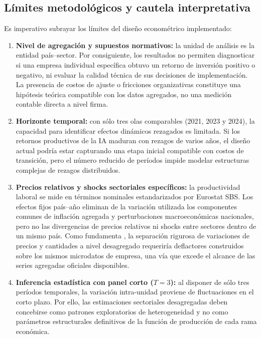 \documentclass[12pt,a4paper]{article}
\begin{document}
\subsection{Límites metodológicos y cautela interpretativa}

Es imperativo subrayar los límites del diseño econométrico implementado:

\begin{enumerate}

    \item \textbf{Nivel de agregación y supuestos normativos:} la unidad de análisis es la entidad país--sector. Por consiguiente, los resultados no permiten diagnosticar si una empresa individual específica obtuvo un retorno de inversión positivo o negativo, ni evaluar la calidad técnica de sus decisiones de implementación. La presencia de costos de ajuste o fricciones organizativas constituye una hipótesis teórica compatible con los datos agregados, no una medición contable directa a nivel firma.

    \item \textbf{Horizonte temporal:} con sólo tres olas comparables (2021, 2023 y 2024), la capacidad para identificar efectos dinámicos rezagados es limitada. Si los retornos productivos de la IA maduran con rezagos de varios años, el diseño actual podría estar capturando una etapa inicial compatible con costos de transición, pero el número reducido de períodos impide modelar estructuras complejas de rezagos distribuidos.

    \item \textbf{Precios relativos y shocks sectoriales específicos:} la productividad laboral se mide en términos nominales estandarizados por Eurostat SBS. Los efectos fijos país--año eliminan de la variación utilizada los componentes comunes de inflación agregada y perturbaciones macroeconómicas nacionales, pero no las divergencias de precios relativos ni shocks entre sectores dentro de un mismo país. Como fundamenta \citet{berndt1991practice}, la separación rigurosa de variaciones de precios y cantidades a nivel desagregado requeriría deflactores construidos sobre los mismos microdatos de empresa, una vía que excede el alcance de las series agregadas oficiales disponibles.

    \item \textbf{Inferencia estadística con panel corto ($T=3$):} al disponer de sólo tres períodos temporales, la variación intra-unidad proviene de fluctuaciones en el corto plazo. Por ello, las estimaciones sectoriales desagregadas deben concebirse como patrones exploratorios de heterogeneidad y no como parámetros estructurales definitivos de la función de producción de cada rama económica.


\end{enumerate}
\end{document}
